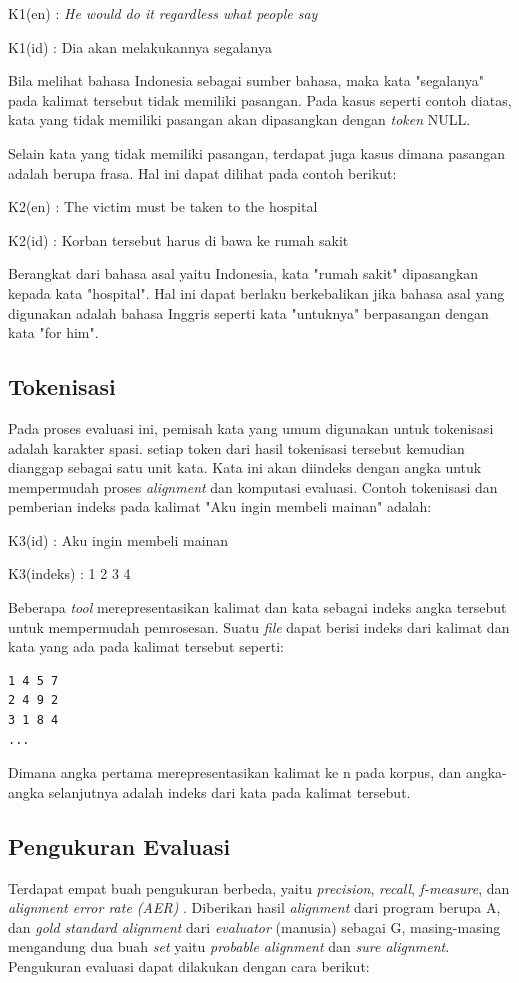 K1(en) : \textit{He would do it regardless what people say}

K1(id) : Dia akan melakukannya segalanya


Bila melihat bahasa Indonesia sebagai sumber bahasa, maka kata "segalanya" pada kalimat tersebut tidak memiliki pasangan. Pada kasus seperti contoh diatas, kata yang tidak memiliki pasangan akan dipasangkan dengan \textit{token} NULL.


Selain kata yang tidak memiliki pasangan, terdapat juga kasus dimana pasangan adalah berupa frasa. Hal ini dapat dilihat pada contoh berikut:


K2(en) : The victim must be taken to the hospital

K2(id) : Korban tersebut harus di bawa ke rumah sakit


Berangkat dari bahasa asal yaitu Indonesia, kata "rumah sakit" dipasangkan kepada kata "hospital". Hal ini dapat berlaku berkebalikan jika bahasa asal yang digunakan adalah bahasa Inggris seperti kata "untuknya" berpasangan dengan kata "for him".

\subsection{Tokenisasi}

Pada proses evaluasi ini, pemisah kata yang umum digunakan untuk tokenisasi adalah karakter spasi. setiap token dari hasil tokenisasi tersebut kemudian dianggap sebagai satu unit kata. Kata ini akan diindeks dengan angka untuk mempermudah proses \textit{alignment} dan komputasi evaluasi. Contoh tokenisasi dan pemberian indeks pada kalimat "Aku ingin membeli mainan" adalah:

K3(id) : Aku ingin membeli mainan

K3(indeks) : 1 2 3 4

Beberapa \textit{tool} merepresentasikan kalimat dan kata sebagai indeks angka tersebut untuk mempermudah pemrosesan. Suatu \textit{file} dapat berisi indeks dari kalimat dan kata yang ada pada kalimat tersebut seperti:
\begin{lstlisting}
1 4 5 7
2 4 9 2
3 1 8 4
...
\end{lstlisting}

Dimana angka pertama merepresentasikan kalimat ke n pada korpus, dan angka-angka selanjutnya adalah indeks dari kata pada kalimat tersebut.

\subsection{Pengukuran Evaluasi}
Terdapat empat buah pengukuran berbeda, yaitu \textit{precision}, \textit{recall}, \textit{f-measure}, dan \textit{alignment error rate (AER)} \citep{mihalcea2003evaluation}. Diberikan hasil \textit{alignment} dari program berupa A, dan \textit{gold standard alignment} dari \textit{evaluator} (manusia) sebagai G, masing-masing mengandung dua buah \textit{set} yaitu \textit{probable alignment} dan \textit{sure alignment}. Pengukuran evaluasi dapat dilakukan dengan cara berikut:

